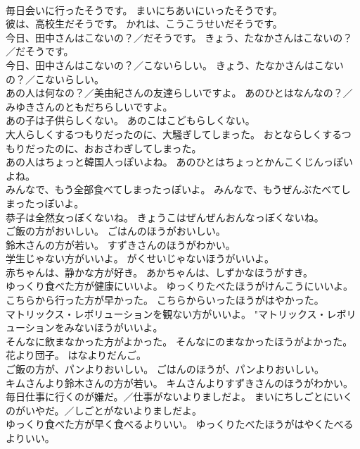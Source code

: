 \documentclass[8pt]{extreport}
\begin{document}
\begin{CJK}{UTF8}{min}
\\	毎日会いに行ったそうです。	まいにちあいにいったそうです。 
\\	彼は、高校生だそうです。	かれは、こうこうせいだそうです。 
\\	今日、田中さんはこないの？／だそうです。	きょう、たなかさんはこないの？／だそうです。 
\\	今日、田中さんはこないの？／こないらしい。	きょう、たなかさんはこないの？／こないらしい。 
\\	あの人は何なの？／美由紀さんの友達らしいですよ。	あのひとはなんなの？／みゆきさんのともだちらしいですよ。 
\\	あの子は子供らしくない。	あのこはこどもらしくない。 
\\	大人らしくするつもりだったのに、大騒ぎしてしまった。	おとならしくするつもりだったのに、おおさわぎしてしまった。 
\\	あの人はちょっと韓国人っぽいよね。	あのひとはちょっとかんこくじんっぽいよね。 
\\	みんなで、もう全部食べてしまったっぽいよ。	みんなで、もうぜんぶたべてしまったっぽいよ。 
\\	恭子は全然女っぽくないね。	きょうこはぜんぜんおんなっぽくないね。 
\\	ご飯の方がおいしい。	ごはんのほうがおいしい。 
\\	鈴木さんの方が若い。	すずきさんのほうがわかい。 
\\	学生じゃない方がいいよ。	がくせいじゃないほうがいいよ。 
\\	赤ちゃんは、静かな方が好き。	あかちゃんは、しずかなほうがすき。 
\\	ゆっくり食べた方が健康にいいよ。	ゆっくりたべたほうがけんこうにいいよ。 
\\	こちらから行った方が早かった。	こちらからいったほうがはやかった。 
\\	マトリックス・レボリューションを観ない方がいいよ。	"マトリックス・レボリューションをみないほうがいいよ。 
\\	そんなに飲まなかった方がよかった。	そんなにのまなかったほうがよかった。 
\\	花より団子。	はなよりだんご。 
\\	ご飯の方が、パンよりおいしい。	ごはんのほうが、パンよりおいしい。 
\\	キムさんより鈴木さんの方が若い。	キムさんよりすずきさんのほうがわかい。 
\\	毎日仕事に行くのが嫌だ。／仕事がないよりましだよ。	まいにちしごとにいくのがいやだ。／しごとがないよりましだよ。 
\\	ゆっくり食べた方が早く食べるよりいい。	ゆっくりたべたほうがはやくたべるよりいい。 

\end{CJK}
\end{document}
